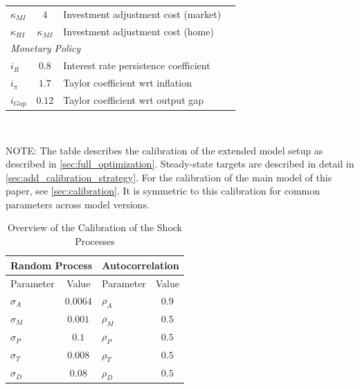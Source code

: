 \documentclass[12pt,3p,authoryear,review]{elsarticle}
\begin{document}
\begin{small}
\begin{table}[h!]
\begin{center}
\begin{scriptsize}
\begin{tabular}{l c l l}
		$\kappa_{MI}$ & $4$ & Investment adjustment cost (market) & \cite{christianoDSGEModelsMonetary2010}\\%
		$\kappa_{HI}$ & $\kappa_{MI}$ & Investment adjustment cost (home) & \cite{gnocchiHouseworkFiscalExpansions2016}\\%
		\hline%
		\multicolumn{4}{l}{\textit{Monetary Policy}}\\%
		$i_R$ & $0.8$ & Interest rate persistence coefficient & \cite{christianoDSGEModelsMonetary2010}\\%
		$i_\pi$ & $1.7$ & Taylor coefficient wrt inflation & \cite{christianoDSGEModelsMonetary2010}\\%
		$i_{Gap}$ & $0.12$ & Taylor coefficient wrt output gap & \cite{christianoDSGEModelsMonetary2010}\\%
		\hline%
	\end{tabular}\\%
	\end{scriptsize}%
	{\tiny \singlespacing NOTE: The table describes the calibration of the extended model setup as described in \ref{sec:full_optimization}. Steady-state targets are described in detail in \ref{sec:add_calibration_strategy}. For the calibration of the main model of this paper, see \cref{sec:calibration}. It is symmetric to this calibration for common parameters across model versions.\par}%
	\end{center}%
\end{table}%
\begin{table}%
	\begin{center}%
		\begin{threeparttable}%
			\begin{scriptsize}%
				\caption{Overview of the Calibration of the Shock Processes}%
				\begin{tabular}{l@{\hskip 12pt}c@{\hskip 36pt}l@{\hskip 12pt}c}
					\hline%
					\multicolumn{2}{c}{Random Process} & \multicolumn{2}{c}{Autocorrelation}\\%
					\hline%
					Parameter & Value 		& Parameter & Value\\%
					\hline \hline%
					$\sigma_A$ & $0.0064$	&$\rho_A$ & $0.9$\\%
					$\sigma_M$ & $0.001$	&$\rho_M$ & $0.5$\\%
					$\sigma_P$ & $0.1$		&$\rho_P$ & $0.5$\\%
					$\sigma_T$ & $0.008$	&$\rho_T$ & $0.5$\\%
					$\sigma_D$ & $0.08$ 	&$\rho_D$ & $0.5$\\%

\end{tabular}
\end{scriptsize}
\end{threeparttable}
\end{center}
\end{table}
\end{small}
\end{document}
